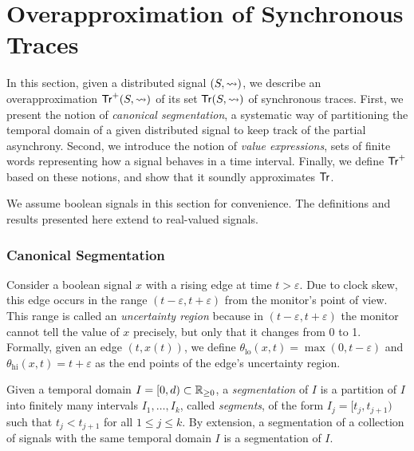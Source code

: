 \section{Overapproximation of Synchronous Traces} \label{sec:approach}
In this section, given a distributed signal $(S,{\rightsquigarrow})$, we describe an overapproximation $\mathsf{Tr}^+(S,{\rightsquigarrow})$ of its set $\mathsf{Tr}(S,{\rightsquigarrow})$ of synchronous traces.
First, we present the notion of \emph{canonical segmentation}, a systematic way of partitioning the temporal domain of a given distributed signal to keep track of the partial asynchrony.
Second, we introduce the notion of \emph{value expressions}, sets of finite words representing how a signal behaves in a time interval.
Finally, we define $\mathsf{Tr}^+$ based on these notions, and show that it soundly approximates $\mathsf{Tr}$.

\begin{remark}
	We assume boolean signals in this section for convenience.
	The definitions and results presented here extend to real-valued signals.
\end{remark}

\subsubsection{Canonical Segmentation}
Consider a boolean signal $x$ with a rising edge at time $t > \varepsilon$.
Due to clock skew, this edge occurs in the range $(t - \varepsilon, t + \varepsilon)$ from the monitor's point of view.
This range is called an \emph{uncertainty region} because in $(t - \varepsilon, t + \varepsilon)$ the monitor cannot tell the value of $x$ precisely, but only that it changes from 0 to 1.
Formally, given an edge $(t, x(t))$, we define $\theta_{\text{lo}}(x,t) = \max(0, t - \varepsilon)$ and $\theta_{\text{hi}}(x,t) = t + \varepsilon$ as the end points of the edge's uncertainty region.

Given a temporal domain $I = [0,d) \subset \mathbb{R}_{\geq 0}$, a \emph{segmentation} of $I$ is a partition of $I$ into finitely many intervals $I_1, \ldots, I_k$, called \emph{segments}, of the form $I_j = [t_j, t_{j+1})$ such that $t_j < t_{j+1}$ for all $1 \leq j \leq k$.
By extension, a segmentation of a collection of signals with the same temporal domain $I$ is a segmentation of $I$.

